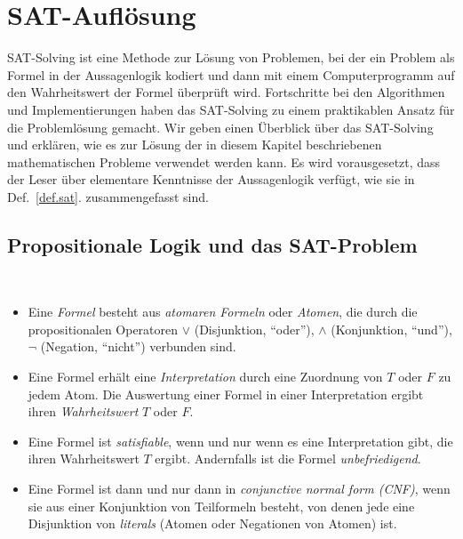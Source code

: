 
\section{SAT-Auflösung}\label{s.sat}

SAT-Solving ist eine Methode zur Lösung von Problemen, bei der ein Problem als Formel in der Aussagenlogik kodiert und dann mit einem Computerprogramm auf den Wahrheitswert der Formel überprüft wird. Fortschritte bei den Algorithmen und Implementierungen haben das SAT-Solving zu einem praktikablen Ansatz für die Problemlösung gemacht. Wir geben einen Überblick über das SAT-Solving und erklären, wie es zur Lösung der in diesem Kapitel beschriebenen mathematischen Probleme verwendet werden kann. Es wird vorausgesetzt, dass der Leser über elementare Kenntnisse der Aussagenlogik verfügt, wie sie in Def.~\ref{def.sat}. zusammengefasst sind.

\subsection{Propositionale Logik und das SAT-Problem}

\begin{definition}\label{def.sat}\mbox{}\\
\begin{itemize}
\item Eine \emph{Formel} besteht aus \emph{atomaren Formeln} oder \emph{Atomen}, die durch die propositionalen Operatoren $\vee$ (Disjunktion, ``oder''), $\wedge$ (Konjunktion, ``und''), $\neg$ (Negation, ``nicht'') verbunden sind.
\item Eine Formel erhält eine \emph{Interpretation} durch eine Zuordnung von $T$ oder $F$ zu jedem Atom. Die Auswertung einer Formel in einer Interpretation ergibt ihren \emph{Wahrheitswert} $T$ oder $F$. 
\item Eine Formel ist \emph{satisfiable}, wenn und nur wenn es eine Interpretation gibt, die ihren Wahrheitswert $T$ ergibt. Andernfalls ist die Formel \emph{unbefriedigend}.
\item Eine Formel ist dann und nur dann in \emph{conjunctive normal form (CNF)}, wenn sie aus einer Konjunktion von Teilformeln besteht, von denen jede eine Disjunktion von \emph{literals} (Atomen oder Negationen von Atomen) ist.
\end{itemize}
\end{definition}

